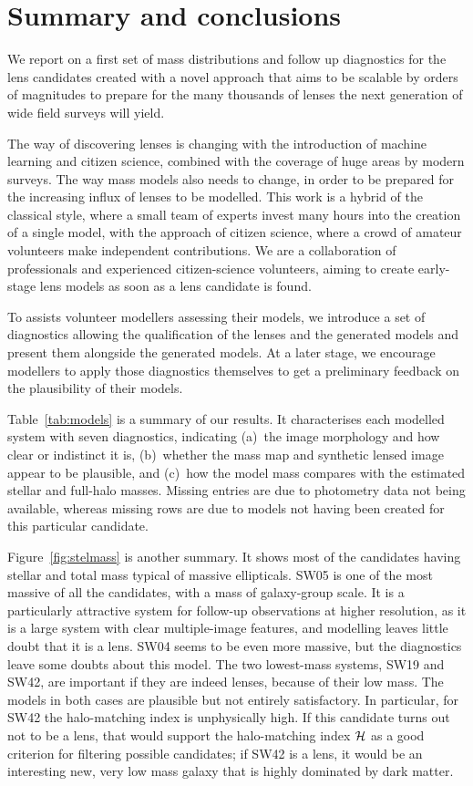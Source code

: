 \section{Summary and conclusions}\label{sec:summary}


We report on a first set of mass distributions and follow up diagnostics for 
the {\SW} lens candidates created with a novel approach that aims to be scalable 
by orders of magnitudes to prepare for the many thousands of lenses the next 
generation of wide field surveys will yield.

The way of discovering lenses is changing with the introduction of
machine learning and citizen science, combined with the coverage of
huge areas by modern surveys.  The way mass models also needs to
change, in order to be prepared for the increasing influx of lenses to
be modelled.  This work is a hybrid of the classical style, where a
small team of experts invest many hours into the creation of a single
model, with the approach of citizen science, where a crowd of amateur
volunteers make independent contributions.  We are a collaboration of
professionals and experienced citizen-science volunteers, aiming to
create early-stage lens models as soon as a lens candidate is found.

To assists volunteer modellers assessing their models, we introduce a
set of diagnostics allowing the qualification of the lenses and the
generated models and present them alongside the generated models. At a
later stage, we encourage modellers to apply those diagnostics
themselves to get a preliminary feedback on the plausibility of their
models.

Table~\ref{tab:models} is a summary of our results.  It characterises
each modelled system with seven diagnostics, indicating (a)~the image
morphology and how clear or indistinct it is, (b)~whether the mass map
and synthetic lensed image appear to be plausible, and (c)~how the
model mass compares with the estimated stellar and full-halo masses.
Missing entries are due to photometry data not being available, whereas
missing rows are due to models not having been created for this particular
candidate.

Figure~\ref{fig:stelmass} is another summary.  It shows most of the
candidates having stellar and total mass typical of massive
ellipticals.  SW05 is one of the most massive of all the candidates, with a
mass of galaxy-group scale.  It is a particularly attractive system
for follow-up observations at higher resolution, as it is a large system
with clear multiple-image features, and modelling leaves little doubt
that it is a lens.
SW04 seems to be even more massive, but the diagnostics leave some doubts
about this model.
The two lowest-mass systems, SW19 and SW42, are
important if they are indeed lenses, because of their low mass.
The models in both cases are plausible but not entirely satisfactory.
In particular, for SW42 the halo-matching index is unphysically high.
If this candidate turns out not to be a lens, that would support
the halo-matching index $\mathcal{H}$ as a good
criterion for filtering possible candidates; if SW42 is a lens,
it would be an interesting new, very low mass galaxy that is highly
dominated by dark matter.


